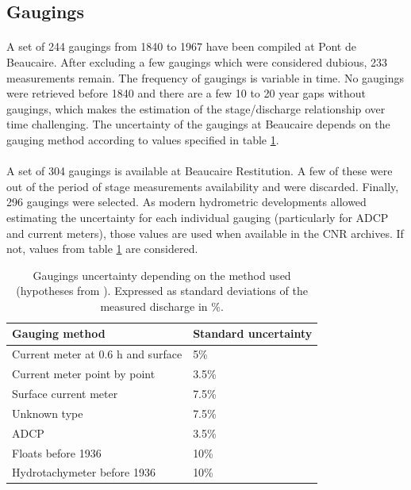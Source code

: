 \documentclass[11pt]{article}
\begin{document}
    \subsection{Gaugings}

    \paragraph{}
    A set of 244 gaugings from 1840 to 1967 have been compiled at Pont de Beaucaire. After excluding a few gaugings which were considered dubious, 233 measurements remain. The frequency of gaugings is variable in time. No gaugings were retrieved before 1840 and there are a few 10 to 20 year gaps without gaugings, which makes the estimation of the stage/discharge relationship over time challenging. The uncertainty of the gaugings at Beaucaire depends on the gauging method according to \citet{bard_actualisation_2018} values specified in table \ref{TabIcJau}.
    
    \paragraph{}    
    A set of 304 gaugings is available at Beaucaire Restitution. A few of these were out of the period of stage measurements availability and were discarded. Finally, 296 gaugings were selected. As modern hydrometric developments allowed estimating the uncertainty for each individual gauging (particularly for ADCP and current meters), those values are used when available in the CNR archives. If not, values from table \ref{TabIcJau} are considered. 
        
         \begin{table}[ht]
            \centering
                \begin{tabular}{| l | l |} 
                        \hline
                        \textbf{Gauging method} & \textbf{Standard uncertainty} \\
                        \hline
                        Current meter at 0.6 h and surface & 5\% \\
                        \hline
                        Current meter point by point & 3.5\% \\
                        \hline
                        Surface current meter & 7.5\% \\
                        \hline
                        Unknown type & 7.5\% \\
                        \hline
                        ADCP & 3.5\% \\
                        \hline
                        Floats before 1936 & 10\% \\
                        \hline
                        Hydrotachymeter before 1936 & 10\%\\
                        \hline
                \end{tabular}
            \caption{Gaugings uncertainty depending on the method used (hypotheses from \citet{bard_actualisation_2018}). Expressed as standard deviations of the measured discharge in \%.}
            \label{TabIcJau}
        \end{table}
 
\end{document}
